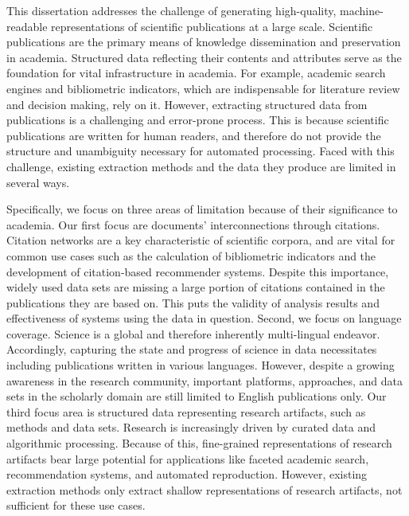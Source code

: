 \Abstract{}
This dissertation addresses the challenge of generating high-quality, machine-readable representations of scientific publications at a large scale.
Scientific publications are the primary means of knowledge dissemination and preservation in academia.
Structured data reflecting their contents and attributes serve as the foundation for vital infrastructure in academia.
For example, academic search engines and bibliometric indicators, which are indispensable for literature review and decision making, %
rely on it.
However, extracting structured data from publications is a challenging and error-prone process.
This is because scientific publications are written for human readers, and therefore do not provide the structure and unambiguity necessary for automated processing. Faced with this challenge, existing extraction methods and the data they produce are limited in several ways. %

Specifically,
we focus on three areas of limitation because of their significance to academia.
Our first focus are documents' interconnections through citations.
Citation networks are a key characteristic of scientific corpora, and are vital for common use cases such as the calculation of bibliometric indicators and the development of citation-based recommender systems. Despite this importance, widely used data sets %
are missing a large portion of citations contained in the publications they are based on.
This puts the validity of analysis results and effectiveness of systems using the data in question.
Second, we focus on language coverage.
Science is a global and therefore inherently multi-lingual endeavor. Accordingly, capturing the state and progress of science in data necessitates including publications written in various languages. However, despite a growing awareness in the
research community, important platforms, approaches, and data sets in the scholarly domain are still limited to English publications only. %
Our third focus area is structured data representing research artifacts, such as methods and data sets. Research is increasingly driven by curated data and algorithmic processing. Because of this, fine-grained representations of research artifacts bear large potential for applications like faceted academic search, recommendation systems, and automated reproduction. However, existing extraction methods only extract shallow representations of research artifacts, not sufficient for these use cases.

